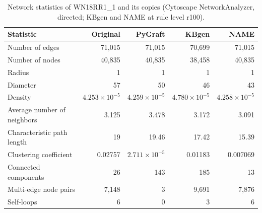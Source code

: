 \begin{table}[t]
\centering
\caption{Network statistics of WN18RR1\_1 and its copies (Cytoscape NetworkAnalyzer, directed; KBgen and NAME at rule level r100).}
\label{tab:cytoscape_WN18RR1_1}
\begin{tabular}{lrrrr}
\toprule
Statistic & Original & PyGraft & KBgen & NAME \\
\midrule
Number of edges & 71{,}015 & 71{,}015 & 70{,}699 & 71{,}015 \\
Number of nodes & 40{,}835 & 40{,}835 & 38{,}458 & 40{,}835 \\
Radius & 1 & 1 & 1 & 1 \\
Diameter & 57 & 50 & 46 & 43 \\
Density & $4.253\times10^{-5}$ & $4.259\times10^{-5}$ & $4.780\times10^{-5}$ & $4.258\times10^{-5}$ \\
Average number of neighbors & 3.125 & 3.478 & 3.172 & 3.091 \\
Characteristic path length & 19 & 19.46 & 17.42 & 15.39 \\
Clustering coefficient & 0.02757 & $2.711\times10^{-5}$ & 0.01183 & 0.007069 \\
Connected components & 26 & 143 & 185 & 13 \\
Multi-edge node pairs & 7{,}148 & 3 & 9{,}691 & 7{,}876 \\
Self-loops & 6 & 0 & 3 & 6 \\
\bottomrule
\end{tabular}
\end{table}
